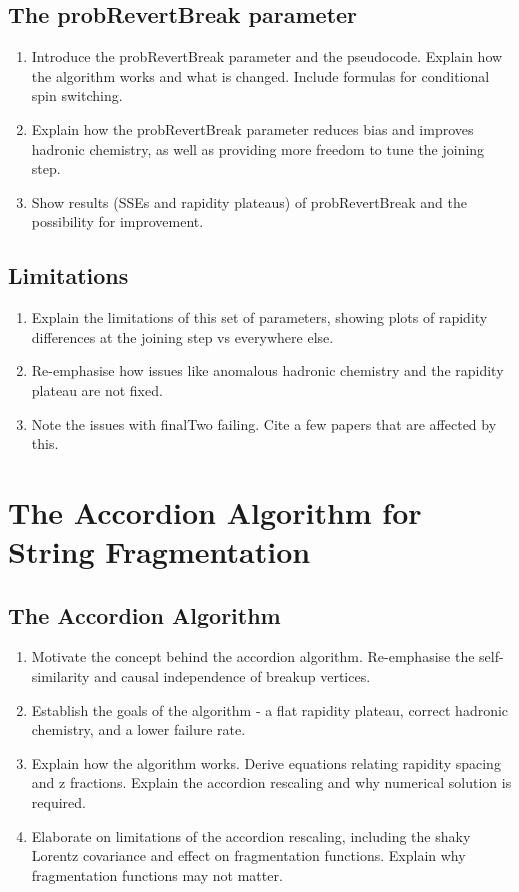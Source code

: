 \documentclass[12pt,a4paper]{report}
\begin{document}
\section{The probRevertBreak parameter}
\begin{enumerate}
\item Introduce the probRevertBreak parameter and the pseudocode. Explain how the algorithm works and what is changed. Include formulas for conditional spin switching.
\item Explain how the probRevertBreak parameter reduces bias and improves hadronic chemistry, as well as providing more freedom to tune the joining step.
\item Show results (SSEs and rapidity plateaus) of probRevertBreak and the possibility for improvement.
\end{enumerate}

\section{Limitations}
\begin{enumerate}
\item Explain the limitations of this set of parameters, showing plots of rapidity differences at the joining step vs everywhere else.
\item Re-emphasise how issues like anomalous hadronic chemistry and the rapidity plateau are not fixed.
\item Note the issues with finalTwo failing. Cite a few papers that are affected by this.
\end{enumerate}

\chapter{The Accordion Algorithm for String Fragmentation}
\label{chap:accordion}
\section{The Accordion Algorithm}
\begin{enumerate}
\item Motivate the concept behind the accordion algorithm. Re-emphasise the self-similarity and causal independence of breakup vertices.
\item Establish the goals of the algorithm - a flat rapidity plateau, correct hadronic chemistry, and a lower failure rate.
\item Explain how the algorithm works. Derive equations relating rapidity spacing and z fractions. Explain the accordion rescaling and why numerical solution is required.
\item Elaborate on limitations of the accordion rescaling, including the shaky Lorentz covariance and effect on fragmentation functions. Explain why fragmentation functions may not matter.
\end{enumerate}
\end{document}
